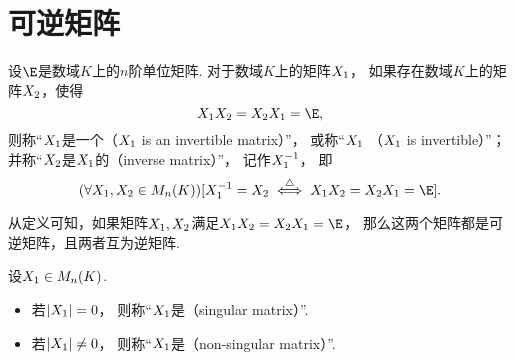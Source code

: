 \section{可逆矩阵}

\begin{definition}\label{definition:可逆矩阵.可逆矩阵的定义}
设\(\E\)是数域\(K\)上的\(n\)阶单位矩阵.
对于数域\(K\)上的矩阵\(X_1\)，
如果存在数域\(K\)上的矩阵\(X_2\)，使得\[
	\A\B=\B\A=\E,
\]
则称“\(X_1\)是一个（\(X_1\) is an invertible matrix）”，
或称“\(X_1\) （\(X_1\) is invertible）”；
并称“\(X_2\)是\(X_1\)的（inverse matrix）”，
记作\(X_1^{-1}\)，
即\[
	(\forall \A,\B\in M_n(K))
	[\A^{-1} = \B \defiff \A\B=\B\A=\E].
\]
\end{definition}

从定义可知，如果矩阵\(X_1,X_2\)满足\(\A\B=\B\A=\E\)，
那么这两个矩阵都是可逆矩阵，且两者互为逆矩阵.

\begin{definition}
设\(X_1 \in M_n(K)\).
\begin{itemize}
	\item 若\(\abs{X_1}=0\)，
	则称“\(X_1\)是（singular matrix）”.
	\item 若\(\abs{X_1} \neq 0\)，
	则称“\(X_1\)是（non-singular matrix）”.
\end{itemize}
\end{definition}


